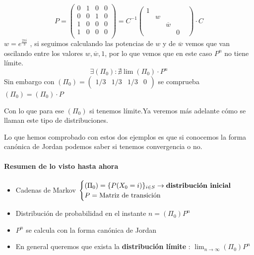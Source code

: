 \begin{example}[2]

	\begin{center}
		\centering
	\end{center}

	$$P = \left( \begin{matrix}
	0 & 1 & 0 & 0\\
	0 & 0 & 1 & 0\\
	1 & 0 & 0 & 0\\
	1 & 0 & 0 & 0\\
	\end{matrix}\right)= C^{-1} \left(\begin{matrix}
	1&&&&\\
	&w&&&\\
	&&\overline{w}&\\
	&&&0
	\end{matrix}
	\right)\cdot C$$
	$w = e^{\frac{2\pi i}{3}}$ , si seguimos calculando las potencias de $w$ y de $\overline{w}$ vemos que van oscilando entre los valores $w , \overline{w} , 1$, por lo que vemos que en este caso $P^n$ no tiene límite.
	$$\exists\left(\Pi_0\right) : \nexists \lim \left(\Pi_0\right)\cdot P^n$$
	Sin embargo con $(\Pi_0) = (\begin{matrix}
	1/3&1/3&1/3&0
	\end{matrix}) $ se comprueba $(\Pi_0) = (\Pi_0)\cdot P$


	Con lo que para ese $(\Pi_0)$ si tenemos límite.Ya veremos más adelante cómo se llaman este tipo de distribuciones.
\end{example}

Lo que hemos comprobado con estos dos ejemplos es que si conocemos la forma canónica de Jordan podemos saber si tenemos convergencia o no.

\paragraph{Resumen de lo visto hasta ahora}
\begin{itemize}
	\item Cadenas de Markov $\begin{cases}
	(\Pi_0) = \{P(X_0 = i)\}_{i \in S} \rightarrow \text{\textbf{distribución inicial}}\\
	P = \text{Matriz de transición}
	\end{cases}$
	\item Distribución de probabilidad en el instante $n = (\Pi_0)P^n$
	\item $P^n$ se calcula con la forma canónica de Jordan
	\item En general queremos que exista la \textbf{distribución límite} : $\lim_{n\rightarrow\infty} (\Pi_0) P^n$
\end{itemize}

